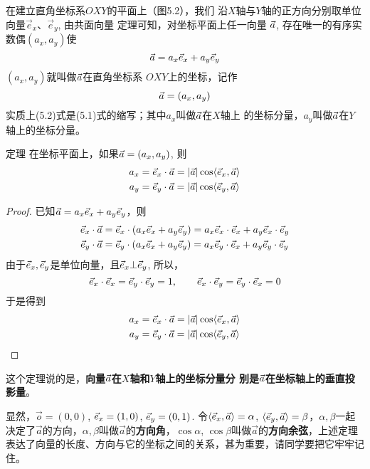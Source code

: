 在建立直角坐标系$OXY$的平面上（图5.2），我们
沿$X$轴与$Y$轴的正方向分别取单位向量$\vec{e}_x$、$\vec{e}_y$, 由共面向量
定理可知，对坐标平面上任一向量
$\vec{a}$, 存在唯一的有序实数偶$(a_x,a_y)$使
\begin{equation}
    \vec{a} =a_x \vec{e}_x+a_y \vec{e}_y
\end{equation}
$(a_x,a_y)$就叫做$\vec{a}$在直角坐标系
$OXY$上的坐标，记作
\begin{equation}
    \vec{a}=(a_x,a_y)
\end{equation}
实质上(5.2)式是(5.1)式的缩写；其中$a_x$叫做$\vec{a}$在$X$轴上
的坐标分量，$a_y$叫做$\vec{a}$在$Y$轴上的坐标分量。

\begin{blk}
    {定理} 在坐标平面上，如果$\vec{a}=(a_x,a_y)$, 则
    \begin{equation}
    \begin{split}
        a_x&=\vec{e}_x\cdot \vec{a}=|\vec{a}|\cos\langle\vec{e}_x,\vec{a}\rangle\\
        a_y&=\vec{e}_y\cdot \vec{a}=|\vec{a}|\cos\langle\vec{e}_y,\vec{a}\rangle\\
    \end{split}
    \end{equation}
\end{blk}

\begin{proof}
    已知$\vec{a} =a_x \vec{e}_x+a_y \vec{e}_y$，则
\[\begin{split}
   \vec{e}_x\cdot \vec{a}&=\vec{e}_x\cdot (a_x\vec{e}_x+a_y\vec{e}_y)=a_x\vec{e}_x\cdot \vec{e}_x+a_y\vec{e}_x\cdot \vec{e}_y\\
   \vec{e}_y\cdot \vec{a}&=\vec{e}_y\cdot (a_x\vec{e}_x+a_y\vec{e}_y)=a_x\vec{e}_y\cdot \vec{e}_x+a_y\vec{e}_y\cdot \vec{e}_y\\ 
\end{split}\]
由于$\vec{e}_x,\vec{e}_y$是单位向量，且$\vec{e}_x\bot \vec{e}_y$, 所以，
\[\vec{e}_x\cdot \vec{e}_x=\vec{e}_y\cdot \vec{e}_y=1,\qquad \vec{e}_x\cdot \vec{e}_y=\vec{e}_y\cdot \vec{e}_x=0\]
于是得到
\[    \begin{split}
    a_x&=\vec{e}_x\cdot \vec{a}=|\vec{a}|\cos\langle\vec{e}_x,\vec{a}\rangle\\
    a_y&=\vec{e}_y\cdot \vec{a}=|\vec{a}|\cos\langle\vec{e}_y,\vec{a}\rangle\\
\end{split}\]
\end{proof}

这个定理说的是，\textbf{向量$\vec{a}$在$X$轴和$Y$轴上的坐标分量分
别是$\vec{a}$在坐标轴上的垂直投影量}。

显然，$\vec{o}=(0, 0)$, $\vec{e}_x=(1, 0)$, $\vec{e}_y=(0, 1)$. 令$\left\langle \vec{e}_x,\vec{a} \right\rangle=\alpha$, $\left\langle \vec{e}_y,\vec{a} \right\rangle=\beta$，$\alpha,\beta$一起决定了$\vec{a}$的方向，$\alpha,\beta$叫做$\vec{a}$的\textbf{方向角}，$\cos\alpha$, $\cos\beta$叫做$\vec{a}$的\textbf{方向余弦}，上述定理表达了向量的长度、方向与它的坐标之间的关系，甚为重要，请同学要把它牢牢记住。

